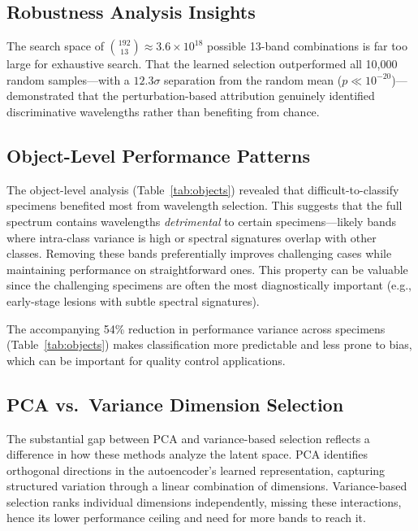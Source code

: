 \subsection{Robustness Analysis Insights}
\label{sec:discussion_robustness}
The search space of $\binom{192}{13} \approx 3.6 \times 10^{18}$ possible 13-band combinations is far too large for exhaustive search.
That the learned selection outperformed all 10,000 random samples---with a $12.3\sigma$ separation from the random mean ($p \ll 10^{-20}$)---demonstrated that the perturbation-based attribution genuinely identified discriminative wavelengths rather than benefiting from chance.

\subsection{Object-Level Performance Patterns}
\label{sec:discussion_objects}
The object-level analysis (Table~\ref{tab:objects}) revealed that difficult-to-classify specimens benefited most from wavelength selection.
This suggests that the full spectrum contains wavelengths \emph{detrimental} to certain specimens---likely bands where intra-class variance is high or spectral signatures overlap with other classes.
Removing these bands preferentially improves challenging cases while maintaining performance on straightforward ones.
This property can be valuable since the challenging specimens are often the most diagnostically important (e.g., early-stage lesions with subtle spectral signatures).

The accompanying 54\% reduction in performance variance across specimens (Table~\ref{tab:objects}) makes classification more predictable and less prone to bias, which can be important for quality control applications.

\subsection{PCA vs.\ Variance Dimension Selection}
\label{sec:discussion_pca}

The substantial gap between PCA and variance-based selection reflects a difference in how these methods analyze the latent space.
PCA identifies orthogonal directions in the autoencoder's learned representation, capturing structured variation through a linear combination of dimensions.
Variance-based selection ranks individual dimensions independently, missing these interactions, hence its lower performance ceiling and need for more bands to reach it.

